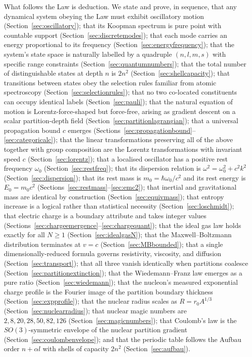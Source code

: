 \documentclass[11pt,twocolumn,a4paper]{article}
\theoremstyle{axiomstyle}
\theoremstyle{conseqstyle}
\theoremstyle{definition}
\theoremstyle{remark}
\begin{document}
What follows the Law is deduction. We state and prove, in sequence, that any dynamical system obeying the Law must exhibit oscillatory motion (Section~\ref{sec:oscillatory}); that its Koopman spectrum is pure point with countable support (Section~\ref{sec:discretemodes}); that each mode carries an energy proportional to its frequency (Section~\ref{sec:energyfrequency}); that the system's state space is naturally labelled by a quadruple $(n,l,m,s)$ with specific range constraints (Section~\ref{sec:quantumnumbers}); that the total number of distinguishable states at depth $n$ is $2n^{2}$ (Section~\ref{sec:shellcapacity}); that transitions between states obey the selection rules familiar from atomic spectroscopy (Section~\ref{sec:selectionrules}); that no two co-located constituents can occupy identical labels (Section~\ref{sec:pauli}); that the natural equation of motion is Lorentz-force-shaped but force-free, arising as gradient descent on a scalar partition-depth field (Section~\ref{sec:partitionlagrangian}); that a universal propagation bound $c$ emerges (Sections~\ref{sec:propagationbound}--\ref{sec:categoricalc}); that the linear transformations preserving all of the above together with group composition are the Lorentz transformations with invariant speed $c$ (Section~\ref{sec:lorentz}); that a localised oscillator has a positive rest frequency $\omega_{0}$ (Section~\ref{sec:restfreq}); that its dispersion relation is $\omega^{2}=\omega_{0}^{2}+c^{2}k^{2}$ (Section~\ref{sec:dispersion}); that its rest mass is $m_{0}=\hbar\omega_{0}/c^{2}$ and its rest energy is $E_{0}=m_{0}c^{2}$ (Sections~\ref{sec:restmass}--\ref{sec:emc2}); that inertial and gravitational mass are identical by construction (Section~\ref{sec:equivmass}); that entropy increase is a logical rather than statistical necessity (Section~\ref{sec:loschmidt}); that electric charge is a boundary attribute and takes integer values (Sections~\ref{sec:chargeemergence}--\ref{sec:chargequant}); that the ideal gas law holds exactly for all $N\ge 1$ (Section~\ref{sec:idealgasN}); that the Maxwell--Boltzmann distribution terminates at $v=c$ (Section~\ref{sec:MBbounded}); that a single dimensionally-reduced formula governs resistivity, viscosity, and diffusion (Section~\ref{sec:transport}); that all three vanish identically when partitions coalesce (Section~\ref{sec:partitionextinction}); that the Wiedemann--Franz law emerges as a pure ratio (Section~\ref{sec:wiedemann}); that the nucleon's measured exponential charge profile is the Fourier image of the partition boundary thickness (Section~\ref{sec:expprofile}); that the nuclear radius scales as $R=r_{0}A^{1/3}$ (Section~\ref{sec:nuclearradius}); that nuclear magic numbers are $2,8,20,28,50,82,126$ (Section~\ref{sec:magicnumbers}); that Coulomb's law is the $SO(3)$-symmetric envelope of the nuclear partition gradient (Section~\ref{sec:coulombenvelope}); and that the periodic table follows the Aufbau order $n+\alpha l$ with shells of capacity $2n^{2}$ (Section~\ref{sec:aufbau}).
\end{document}
